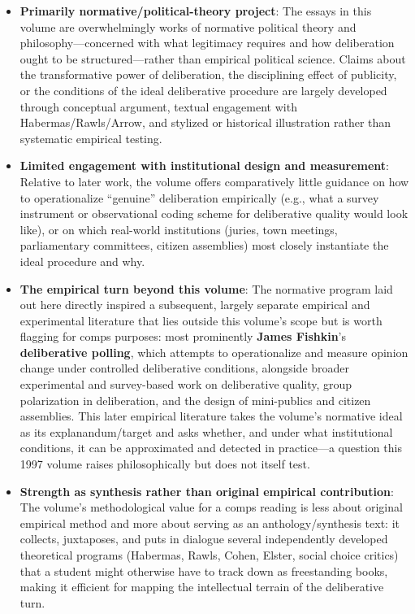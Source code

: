 \documentclass[12pt]{article}
\begin{document}
\begin{itemize}[leftmargin=*, itemsep=4pt]
    \item \textbf{Primarily normative/political-theory project}: The essays in this volume are overwhelmingly works of normative political theory and philosophy---concerned with what legitimacy requires and how deliberation ought to be structured---rather than empirical political science. Claims about the transformative power of deliberation, the disciplining effect of publicity, or the conditions of the ideal deliberative procedure are largely developed through conceptual argument, textual engagement with Habermas/Rawls/Arrow, and stylized or historical illustration rather than systematic empirical testing.
    \item \textbf{Limited engagement with institutional design and measurement}: Relative to later work, the volume offers comparatively little guidance on how to operationalize ``genuine'' deliberation empirically (e.g., what a survey instrument or observational coding scheme for deliberative quality would look like), or on which real-world institutions (juries, town meetings, parliamentary committees, citizen assemblies) most closely instantiate the ideal procedure and why.
    \item \textbf{The empirical turn beyond this volume}: The normative program laid out here directly inspired a subsequent, largely separate empirical and experimental literature that lies outside this volume's scope but is worth flagging for comps purposes: most prominently \textbf{James Fishkin}'s \textbf{deliberative polling}, which attempts to operationalize and measure opinion change under controlled deliberative conditions, alongside broader experimental and survey-based work on deliberative quality, group polarization in deliberation, and the design of mini-publics and citizen assemblies. This later empirical literature takes the volume's normative ideal as its explanandum/target and asks whether, and under what institutional conditions, it can be approximated and detected in practice---a question this 1997 volume raises philosophically but does not itself test.
    \item \textbf{Strength as synthesis rather than original empirical contribution}: The volume's methodological value for a comps reading is less about original empirical method and more about serving as an anthology/synthesis text: it collects, juxtaposes, and puts in dialogue several independently developed theoretical programs (Habermas, Rawls, Cohen, Elster, social choice critics) that a student might otherwise have to track down as freestanding books, making it efficient for mapping the intellectual terrain of the deliberative turn.
\end{itemize}
\end{document}
